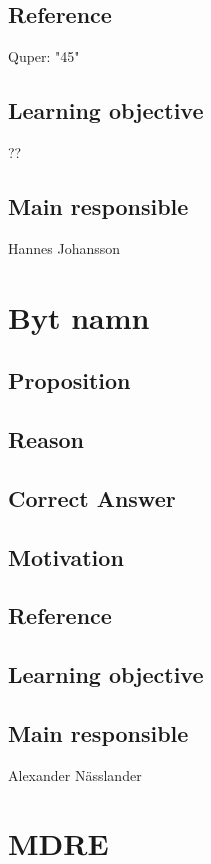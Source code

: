 \documentclass[a4paper]{article}
\begin{document}
\subsection*{Reference}
Quper: "45"
\subsection*{Learning objective}
??
\subsection*{Main responsible}
Hannes Johansson


\section{Byt namn}
\subsection*{Proposition}

\subsection*{Reason}

\subsection*{Correct Answer}

\subsection*{Motivation}
 
\subsection*{Reference}

\subsection*{Learning objective}

\subsection*{Main responsible}
Alexander Nässlander


\section{MDRE}
\end{document}
